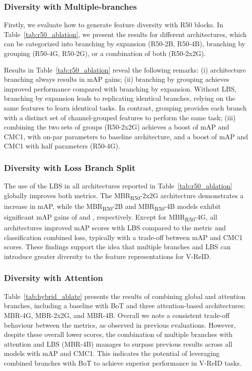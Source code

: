 \documentclass[letterpaper, 10pt, conference]{ieeeconf}
\begin{document}
\subsubsection{Diversity with Multiple-branches}


Firstly, we evaluate how to generate feature diversity with R50 blocks. In Table~\ref{tab:r50_ablation}, we present the results for different architectures, which can be categorized into branching by expansion (R50-2B, R50-4B), branching by grouping (R50-4G, R50-2G), or a combination of both (R50-2x2G).

Results in Table~\ref{tab:r50_ablation} reveal the following remarks: 
(i) architecture branching always results in mAP gains; (ii) branching by grouping achieves improved performance compared with branching by expansion. Without LBS, branching by expansion leads to replicating identical branches, relying on the same features to learn identical tasks. In contrast, grouping provides each branch with a distinct set of channel-grouped features to perform the same task; (iii) combining the two sets of groups (R50-2x2G) achieves a boost of  mAP and  CMC1, with on-par parameters to baseline architecture, and a boost of  mAP and  CMC1 with half parameters (R50-4G).

\subsubsection{Diversity with Loss Branch Split}


The use of the LBS in all architectures reported in Table~\ref{tab:r50_ablation} globally improves both metrics. 
The MBR\textsubscript{R50}-2x2G architecture demonstrates a  increase in mAP, while the MBR\textsubscript{R50}-2B and MBR\textsubscript{R50}-4B models exhibit significant mAP gains of  and , respectively. 
Except for MBR\textsubscript{R50}-4G, all architectures improved mAP scores with LBS compared to the metric and classification combined loss, typically with a trade-off between mAP and CMC1 scores.
These findings support the idea that multiple branches and LBS can introduce greater diversity to the feature representations for V-ReID.

\subsubsection{Diversity with Attention}

Table~\ref{tab:hybrid_ablate} presents the results of combining global and attention branches, including a baseline with BoT and three attention-based architectures: MBR-4G, MBR-2x2G, and MBR-4B. Overall we note a consistent trade-off behaviour between the metrics, as observed in previous evaluations. However, despite these overall lower scores, the combination of multiple branches with attention and LBS (MBR-4B) manages to surpass previous results across all models with  mAP and  CMC1. This indicates the potential of leveraging combined branches with BoT to achieve superior performance in V-ReID tasks.
\end{document}
